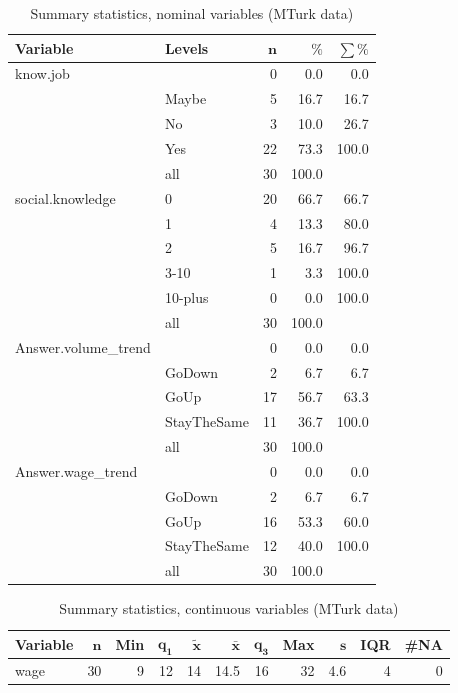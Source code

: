 \documentclass[a4paper,10pt]{article}\usepackage[]{graphicx}\usepackage[]{color}
\begin{document}
\begin{table}[ht]
\centering
{\footnotesize
\begin{tabular}{ll|rrr}
 \textbf{Variable} & \textbf{Levels} & $\mathbf{n}$ & $\mathbf{\%}$ & $\mathbf{\sum \%}$ \\ 
  \hline
know.job &  & 0 & 0.0 & 0.0 \\ 
   & Maybe & 5 & 16.7 & 16.7 \\ 
   & No & 3 & 10.0 & 26.7 \\ 
   & Yes & 22 & 73.3 & 100.0 \\ 
   \hline
 & all & 30 & 100.0 &  \\ 
   \hline
\hline
social.knowledge & 0 & 20 & 66.7 & 66.7 \\ 
   & 1 & 4 & 13.3 & 80.0 \\ 
   & 2 & 5 & 16.7 & 96.7 \\ 
   & 3-10 & 1 & 3.3 & 100.0 \\ 
   & 10-plus & 0 & 0.0 & 100.0 \\ 
   \hline
 & all & 30 & 100.0 &  \\ 
   \hline
\hline
Answer.volume\_trend &  & 0 & 0.0 & 0.0 \\ 
   & GoDown & 2 & 6.7 & 6.7 \\ 
   & GoUp & 17 & 56.7 & 63.3 \\ 
   & StayTheSame & 11 & 36.7 & 100.0 \\ 
   \hline
 & all & 30 & 100.0 &  \\ 
   \hline
\hline
Answer.wage\_trend &  & 0 & 0.0 & 0.0 \\ 
   & GoDown & 2 & 6.7 & 6.7 \\ 
   & GoUp & 16 & 53.3 & 60.0 \\ 
   & StayTheSame & 12 & 40.0 & 100.0 \\ 
   \hline
 & all & 30 & 100.0 &  \\ 
   \hline
\hline
\end{tabular}
}
\caption{Summary statistics, nominal variables (MTurk data)} 
\label{tab1:39-9020}
\end{table}
\begin{table}[ht]
\centering
{\footnotesize
\begin{tabular}{lrrrrrrrrrr}
 \textbf{Variable} & $\mathbf{n}$ & \textbf{Min} & $\mathbf{q_1}$ & $\mathbf{\widetilde{x}}$ & $\mathbf{\bar{x}}$ & $\mathbf{q_3}$ & \textbf{Max} & $\mathbf{s}$ & \textbf{IQR} & \textbf{\#NA} \\ 
  \hline
wage & 30 & 9 & 12 & 14 & 14.5 & 16 & 32 & 4.6 & 4 & 0 \\ 
  \end{tabular}
}
\caption{Summary statistics, continuous variables (MTurk data)} 
\label{tab2:39-9020}
\end{table}
\end{document}
